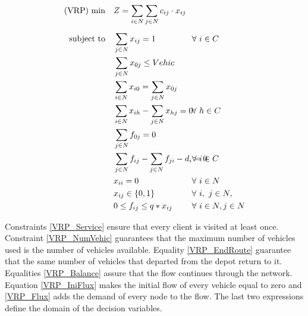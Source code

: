 \documentclass[preprint,review,12pt]{elsarticle}
\begin{document}
\begin{align}
	\text{(VRP) min} \quad      & Z = \sum\limits_{i\in N}\sum\limits_{j\in N} c_{ij} \cdot x_{ij}    && \label{VRP_FObj}    \\[5pt]
	\noindent \text{subject to} \quad & \sum\limits_{j \in N} x_{ij} = 1                    && \text{\hspace{-1cm}} \forall \ i \in C \label{VRP_Service} \\
	& \sum\limits_{j \in N} x_{0j} \leq Vehic                    && \text{\hspace{-1cm}}  \label{VRP_NumVehic} \\
	& \sum\limits_{i \in N}x_{i0} =  \sum\limits_{j \in N}x_{0j}                                             && \text{\hspace{-1cm}}  \label{VRP_EndRoute} \\
	& \sum\limits_{i \in N}x_{ih} - \sum\limits_{j \in N}x_{hj} = 0             && \text{\hspace{-1cm}} \forall \ h \in C \label{VRP_Balance} \\
	& \sum\limits_{j \in N}f_{0j}  = 0             && \text{\hspace{-1cm}} \label{VRP_IniFlux} \\
	& \sum\limits_{j \in N}f_{ij} - \sum\limits_{j \in N}f_{ji} - d_i  = 0             && \text{\hspace{-1cm}} \forall \ i \in C \label{VRP_Flux} \\
	& x_{ii} = 0             && \text{\hspace{-1cm}} \forall \ i \in N \label{VRP_Diag} \\
	& x_{ij} \in\{0,1\}                                                         && \text{\hspace{-1cm}} \forall \ i, \ j \in N, \label{VRP_DomainX}\\
	& 0 \leq f_{ij} \leq q*x_{ij}                                                           && \text{\hspace{-1cm}} \forall \ i \in N, j \in N \label{VRP_DomainF}
\end{align}

Constraints \eqref{VRP_Service} ensure that every client is visited at least once. Constraint \eqref{VRP_NumVehic} guarantees that the maximum number of vehicles used is the number of vehicles available. Equality \eqref{VRP_EndRoute} guarantee that the same number of vehicles that departed from the depot return to it. Equalities \eqref{VRP_Balance} assure that the flow continues through the network. Equation \eqref{VRP_IniFlux} makes the initial flow of every vehicle equal to zero and \eqref{VRP_Flux} adds the demand of every node to the flow.  The last two expressions define the domain of the decision variables.
\end{document}

